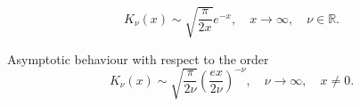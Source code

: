 \documentclass[10pt,a4paper,oneside]{article}
\numberwithin{equation}{section}
\begin{document}
\begin{equation}\label{besselk_x_to_inf}
K_{\nu}(x) \sim \sqrt{\frac{\pi}{2x}} e^{-x}, \quad x \to \infty, \quad \nu \in \mathbb{R}.
\end{equation}

Asymptotic behaviour with respect to the order
\begin{equation}\label{besselk_order_to_inf}
K_{\nu}(x) \sim \sqrt{\frac{\pi}{2\nu}}\left(\frac{ex}{2\nu}\right)^{-\nu}, \quad \nu \to \infty, \quad x \neq 0.
\end{equation}



\end{document}
